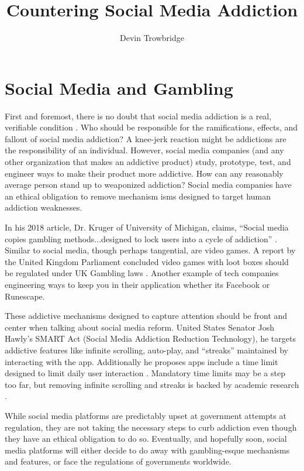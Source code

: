 \documentclass[format=sigconf]{acmart}
\title{Countering Social Media Addiction}
\author{Devin Trowbridge}
\affiliation{%
  \department{Computer Science and Software Engineering}
  \institution{Auburn University}
  \email{dkt0003@auburn.edu}
  \city{Huntsville}
  \state{Alabama}
  \country{United States}}
\begin{document}
\maketitle

\section{Social Media and Gambling}

First and foremost, there is no doubt that social media addiction is a real, verifiable condition \cite{kuss}. Who should be responsible for the ramifications, effects, and fallout of social media addiction? A knee-jerk reaction might be addictions are the responsibility of an individual. However, social media companies (and any other organization that makes an addictive product) study, prototype, test, and engineer ways to make their product more addictive. How can any reasonably average person stand up to weaponized addiction? Social media companies have an ethical obligation to remove mechanism isms designed to target human addiction weaknesses. 

In his 2018 article, Dr. Kruger of University of Michigan, claims, ``Social media copies gambling methods...designed to lock  users into a cycle of addiction'' \cite{kruger}. Similar to social media, though perhaps tangential, are video games. A report by the United Kingdom Parliament concluded video games with loot boxes should be regulated under UK Gambling laws \cite{lootbox} . Another example of tech companies engineering ways to keep you in their application whether its Facebook or Runescape. 

These addictive mechanisms designed to capture attention should be front and center when talking about social media reform. United States Senator Josh Hawly's SMART Act (Social Media Addiction Reduction Technology), he targets addictive features like infinite scrolling, auto-play, and ``streaks'' maintained by interacting with the app. Additionally he proposes apps include a time limit designed to limit daily user interaction \cite{npr}. Mandatory time limits may be a step too far, but removing infinite scrolling and streaks is backed by academic research \cite{kruger}. 

While social media platforms are predictably upset at government attempts at regulation, they are not taking the necessary steps to curb addiction even though they have an ethical obligation to do so. Eventually, and hopefully soon, social media platforms will either decide to do away with gambling-esque mechanisms and features, or face the regulations of governments worldwide.
 
\medskip



\end{document}
